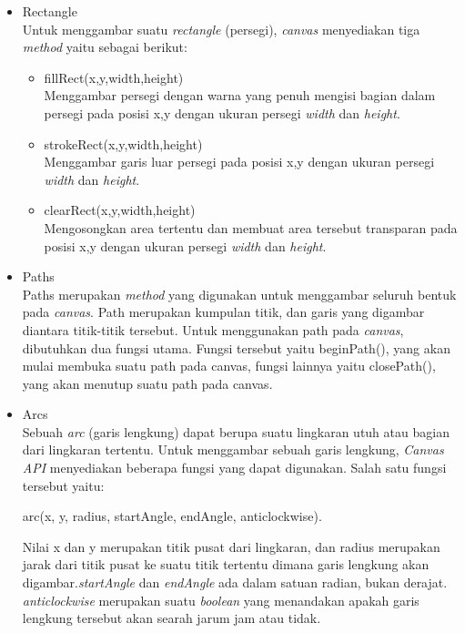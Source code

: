 \begin{itemize}
	\item Rectangle \\
	Untuk menggambar suatu \textit{rectangle} (persegi), \textit{canvas} menyediakan tiga \textit{method} yaitu sebagai berikut:
	\begin{itemize}
		\item fillRect(x,y,width,height) \\
		Menggambar persegi dengan warna yang penuh mengisi bagian dalam persegi pada posisi x,y dengan ukuran persegi \textit{width} dan \textit{height}.
		\item strokeRect(x,y,width,height) \\
		Menggambar garis luar persegi pada posisi x,y dengan ukuran persegi \textit{width} dan \textit{height}.
		\item clearRect(x,y,width,height) \\
		Mengosongkan area tertentu dan membuat area tersebut transparan pada posisi x,y dengan ukuran persegi \textit{width} dan \textit{height}.
	\end{itemize}
	
	\item Paths\\
	Paths merupakan \textit{method} yang digunakan untuk menggambar seluruh bentuk pada \textit{canvas}. Path merupakan kumpulan titik, dan garis yang digambar diantara titik-titik tersebut. Untuk menggunakan path pada \textit{canvas}, dibutuhkan dua fungsi utama. Fungsi tersebut yaitu beginPath(), yang akan mulai membuka suatu path pada canvas, fungsi lainnya yaitu closePath(), yang akan menutup suatu path pada canvas.
	
	\item Arcs \\
	Sebuah \textit{arc} (garis lengkung) dapat berupa suatu lingkaran utuh atau bagian dari lingkaran tertentu. Untuk menggambar sebuah garis lengkung, \textit{Canvas API} menyediakan beberapa fungsi yang dapat digunakan. Salah satu fungsi tersebut yaitu: 
	
	arc(x, y, radius, startAngle, endAngle, anticlockwise).
	
	Nilai x dan y merupakan titik pusat dari lingkaran, dan radius merupakan jarak dari titik pusat ke suatu titik tertentu dimana garis lengkung akan digambar.\textit{startAngle} dan \textit{endAngle} ada dalam satuan radian, bukan derajat. \textit{anticlockwise} merupakan suatu \textit{boolean} yang menandakan apakah garis lengkung tersebut akan searah jarum jam atau tidak.
\end{itemize}

